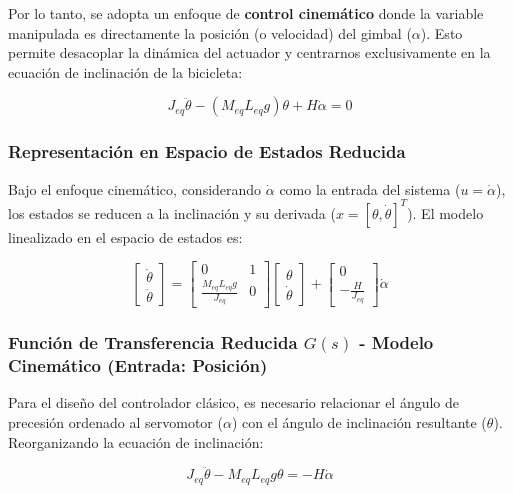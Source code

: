 \documentclass[12pt,letterpaper]{report}
\begin{document}
Por lo tanto, se adopta un enfoque de \textbf{control cinemático} donde la variable manipulada es directamente la posición (o velocidad) del gimbal ($\alpha$). Esto permite desacoplar la dinámica del actuador y centrarnos exclusivamente en la ecuación de inclinación de la bicicleta:

\begin{equation}
    J_{eq}\ddot{\theta} - (M_{eq}L_{eq}g)\theta + H\dot{\alpha} = 0
\end{equation}

\subsubsection*{Representación en Espacio de Estados Reducida}

Bajo el enfoque cinemático, considerando $\dot{\alpha}$ como la entrada del sistema ($u = \dot{\alpha}$), los estados se reducen a la inclinación y su derivada ($x = [\theta, \dot{\theta}]^T$). El modelo linealizado en el espacio de estados es:

\begin{equation}
    \begin{bmatrix} \dot{\theta} \\ \ddot{\theta} \end{bmatrix} = 
    \begin{bmatrix} 0 & 1 \\ \frac{M_{eq}L_{eq}g}{J_{eq}} & 0 \end{bmatrix}
    \begin{bmatrix} \theta \\ \dot{\theta} \end{bmatrix} + 
    \begin{bmatrix} 0 \\ -\frac{H}{J_{eq}} \end{bmatrix} \dot{\alpha}
\end{equation}

\subsubsection*{Función de Transferencia Reducida $G(s)$ - Modelo Cinemático (Entrada: Posición)}

Para el diseño del controlador clásico, es necesario relacionar el ángulo de precesión ordenado al servomotor ($\alpha$) con el ángulo de inclinación resultante ($\theta$). Reorganizando la ecuación de inclinación:

\begin{equation}
    J_{eq}\ddot{\theta} - M_{eq}L_{eq}g\theta = -H\dot{\alpha}
\end{equation}
\end{document}
